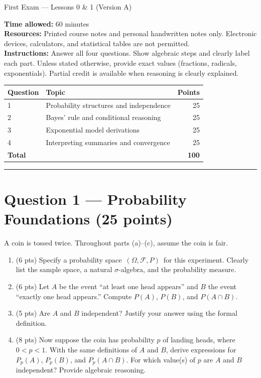 \documentclass[11pt]{article}
\begin{document}
\begin{center}
{\LARGE First Exam — Lessons 0 \& 1 (Version A)}\\[0.75em]
\end{center}

\noindent\textbf{Time allowed:} 60 minutes\\
\textbf{Resources:} Printed course notes and personal handwritten notes only. Electronic devices, calculators, and statistical tables are not permitted.\\
\textbf{Instructions:} Answer all four questions. Show algebraic steps and clearly label each part. Unless stated otherwise, provide exact values (fractions, radicals, exponentials). Partial credit is available when reasoning is clearly explained.

\vspace{0.75em}
\noindent\begin{tabular}{@{}p{2.2cm}p{8.2cm}r@{}}
\toprule
\textbf{Question} & \textbf{Topic} & \textbf{Points}\\
\midrule
1 & Probability structures and independence & 25\\
2 & Bayes' rule and conditional reasoning & 25\\
3 & Exponential model derivations & 25\\
4 & Interpreting summaries and convergence & 25\\
\midrule
\textbf{Total} & & \textbf{100}\\
\bottomrule
\end{tabular}

\vspace{1em}
\hrule
\vspace{1em}

\section*{Question 1 — Probability Foundations (25 points)}

A coin is tossed twice. Throughout parts (a)–(c), assume the coin is fair.

\begin{enumerate}
  \item (6 pts) Specify a probability space $\,(\Omega, \mathcal{F}, P)\,$ for this experiment. Clearly list the sample space, a natural $\sigma$-algebra, and the probability measure.
  \item (6 pts) Let $A$ be the event ``at least one head appears'' and $B$ the event ``exactly one head appears.'' Compute $P(A)$, $P(B)$, and $P(A \cap B)$.
  \item (5 pts) Are $A$ and $B$ independent? Justify your answer using the formal definition.
  \item (8 pts) Now suppose the coin has probability $p$ of landing heads, where $0 < p < 1$. With the same definitions of $A$ and $B$, derive expressions for $P_p(A)$, $P_p(B)$, and $P_p(A \cap B)$. For which value(s) of $p$ are $A$ and $B$ independent? Provide algebraic reasoning.
\end{enumerate}
\end{document}
